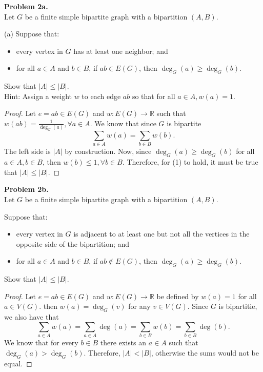 \documentclass{article}
\newcommand{\R}{\mathbb{R}}
\newenvironment{hwproof}[2]
{
    \textbf{Problem #1.}\\
    #2
    \begin{proof}
}{
    \end{proof}
    \newpage
}
\begin{document}
\begin{hwproof}
    {2a}
    {
        Let $G$ be a finite simple bipartite graph with a bipartition $(A, B)$.

        (a) Suppose that:
        \begin{itemize}
            \item every vertex in $G$ has at least one neighbor; and
            \item for all $a \in A$ and $b \in B$, if $ab \in E(G)$, then
                  $\deg_G(a) \geq \deg_G(b)$.
        \end{itemize}
        Show that $|A| \leq |B|$.\\
        Hint: Assign a weight $w$ to each edge $ab$ so that for all $a \in A, w(a) = 1$.
    }
    Let $e = ab \in E(G)$ and $w: E(G) \to \R$ such that $w(ab) = \frac{1}{\deg_G(a)}, \forall a \in A$. We know that since $G$
    is bipartite
    \begin{equation}
        \sum_{a \in A} w(a) = \sum_{b \in B} w(b).
    \end{equation}
    The left side is $|A|$ by construction. Now, since $\deg_G(a) \geq \deg_G(b)$
    for all $a \in A, b \in B$, then $w(b) \leq 1, \forall b \in B$. Therefore,
    for (1) to hold, it must be true that $|A| \leq |B|$.
\end{hwproof}

\begin{hwproof}
    {2b}
    {
        Let $G$ be a finite simple bipartite graph with a bipartition $(A, B)$.

        Suppose that:
        \begin{itemize}
            \item every vertex in $G$ is adjacent to at least one but not all the vertices in the
                  opposite side of the bipartition; and
            \item  for all $a \in A$ and $b \in B$, if $ab \not \in E(G)$, then
                  $\deg_G(a) \geq \deg_G(b)$.
        \end{itemize}
        Show that $|A| \leq |B|$.
    }
    Let $e = ab \in E(G)$ and $w: E(G) \to \R$ be defined by
    $w(a) = 1$ for all $a \in V(G)$. then $w(a) = \deg_G(v)$ for any $v \in V(G)$.
    Since $G$ is bipartitie, we also have that
    \begin{equation}
        \sum_{a \in A} w(a) = \sum_{a \in A} \deg(a) = \sum_{b \in B} w(b) = \sum_{b \in B} \deg(b).
    \end{equation}
    We know that for every $b \in B$ there exists an $a \in A$ such that
    $\deg_G(a) > \deg_G(b)$. Therefore, $|A| < |B|$, otherwise the sums would not
    be equal.


\end{hwproof}
\end{document}
